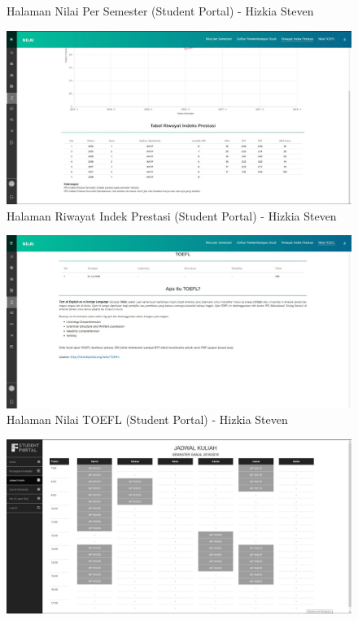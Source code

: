 \begin{itemize}
\begin{enumerate}
\begin{figure}[H]
			\caption{Halaman Nilai Per Semester (Student Portal) - Hizkia Steven}
			\label{fig:2015_2_nps_studentportal}
		\end{figure}
		\begin{figure}[H]
			\centering
			\includegraphics[scale=0.325]{Gambar/HasilPengujian/2015_2_rip_studentportal}
			\caption{Halaman Riwayat Indek Prestasi (Student Portal) - Hizkia Steven}
			\label{fig:2015_2_rip_studentportal}
		\end{figure}
		\begin{figure}[H]
			\centering
			\includegraphics[scale=0.325]{Gambar/HasilPengujian/2015_2_toefl_studentportal}
			\caption{Halaman Nilai TOEFL (Student Portal) - Hizkia Steven}
			\label{fig:2015_2_toefl_studentportal}
		\end{figure}
		\begin{figure}[H]
			\centering
			\includegraphics[scale=0.325]{Gambar/HasilPengujian/2015_2_jadwal_kuliah_ifstudentportal}

\end{figure}
\end{enumerate}
\end{itemize}
